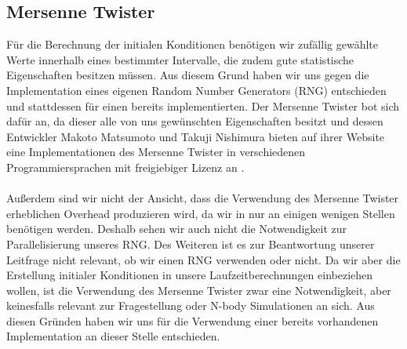 \documentclass[
	12pt,
	a4paper,
	BCOR10mm,
	DIV14,
	headsepline,
	usegeometry,
]{scrreprt}
\begin{document}
\subsection{Mersenne Twister}
Für die Berechnung der initialen Konditionen benötigen wir zufällig gewählte Werte innerhalb eines bestimmter Intervalle, die zudem gute statistische Eigenschaften besitzen müssen. Aus diesem Grund haben wir uns gegen die Implementation eines eigenen Random Number Generators (RNG) entschieden und stattdessen für einen bereits implementierten. Der Mersenne Twister bot sich dafür an, da dieser alle von uns gewünschten Eigenschaften besitzt und dessen Entwickler Makoto Matsumoto und Takuji Nishimura bieten auf ihrer Website eine Implementationen des Mersenne Twister in verschiedenen Programmiersprachen mit freigiebiger Lizenz an \cite{mersenne}. \\\\ Außerdem sind wir nicht der Ansicht, dass die Verwendung des Mersenne Twister erheblichen Overhead produzieren wird, da wir in nur an einigen wenigen Stellen benötigen werden. Deshalb sehen wir auch nicht die Notwendigkeit zur Parallelisierung unseres RNG. Des Weiteren ist es zur Beantwortung unserer Leitfrage nicht relevant, ob wir einen RNG verwenden oder nicht. Da wir aber die Erstellung initialer Konditionen in unsere Laufzeitberechnungen einbeziehen wollen, ist die Verwendung des Mersenne Twister zwar eine Notwendigkeit, aber keinesfalls relevant zur Fragestellung oder N-body Simulationen an sich. Aus diesen Gründen haben wir uns für die Verwendung einer bereits vorhandenen Implementation an dieser Stelle entschieden.
\end{document}
